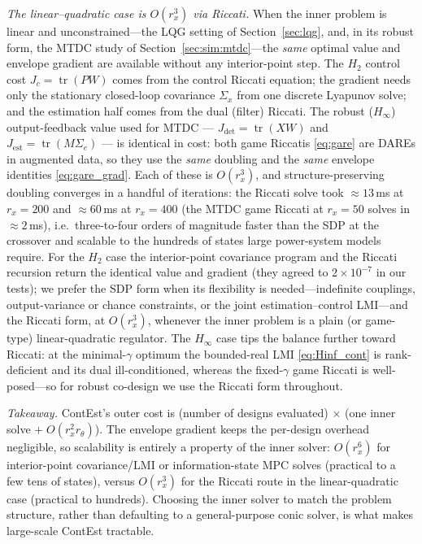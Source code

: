 \documentclass[twocolumn,amsthm]{autart}
\begin{document}
\emph{The linear--quadratic case is $O(r_x^3)$ via Riccati.} When the inner problem
is linear and unconstrained---the LQG setting of Section~\ref{sec:lqg}, and, in its
robust form, the MTDC study of Section~\ref{sec:sim:mtdc}---the \emph{same} optimal
value and envelope gradient are available without any interior-point step. The
$H_2$ control cost $J_c=\operatorname{tr}(P W)$ comes from the control Riccati
equation; the gradient needs only the stationary closed-loop covariance $\Sigma_x$
from one discrete Lyapunov solve; and the estimation half comes from the dual
(filter) Riccati. The robust ($H_\infty$) output-feedback value used for MTDC ---
$J_{\mathrm{det}}=\operatorname{tr}(XW)$ and $J_{\mathrm{est}}=\operatorname{tr}(M\Sigma_e)$
--- is identical in cost: both game Riccatis \eqref{eq:gare} are DAREs in augmented
data, so they use the \emph{same} doubling and the \emph{same} envelope identities
\eqref{eq:gare_grad}. Each of these is $O(r_x^3)$, and
structure-preserving doubling converges in a handful of iterations: the Riccati
solve took $\approx\!13\,$ms at $r_x=200$ and $\approx\!60\,$ms at $r_x=400$
(the MTDC game Riccati at $r_x=50$ solves in $\approx\!2\,$ms), i.e.\
three-to-four orders of magnitude faster than the SDP at the crossover and scalable
to the hundreds of states large power-system models require. For the $H_2$ case the
interior-point covariance program and the Riccati recursion return the identical
value and gradient (they agreed to $2\!\times\!10^{-7}$ in our tests); we prefer the
SDP form when its flexibility is needed---indefinite couplings, output-variance or
chance constraints, or the joint estimation--control LMI---and the Riccati form, at
$O(r_x^3)$, whenever the inner problem is a plain (or game-type) linear-quadratic
regulator. The $H_\infty$ case tips the balance further toward Riccati: at the
minimal-$\gamma$ optimum the bounded-real LMI \eqref{eq:Hinf_cont} is rank-deficient
and its dual ill-conditioned, whereas the fixed-$\gamma$ game Riccati is
well-posed---so for robust co-design we use the Riccati form throughout.

\emph{Takeaway.} ContEst's outer cost is (number of designs evaluated) $\times$
(one inner solve $+\;O(r_x^2 r_\theta)$). The envelope gradient keeps the
per-design overhead negligible, so scalability is entirely a property of the inner
solver: $O(r_x^6)$ for interior-point covariance/LMI or information-state MPC
solves (practical to a few tens of states), versus $O(r_x^3)$ for the Riccati
route in the linear-quadratic case (practical to hundreds). Choosing the inner
solver to match the problem structure, rather than defaulting to a general-purpose
conic solver, is what makes large-scale ContEst tractable.
\end{document}
